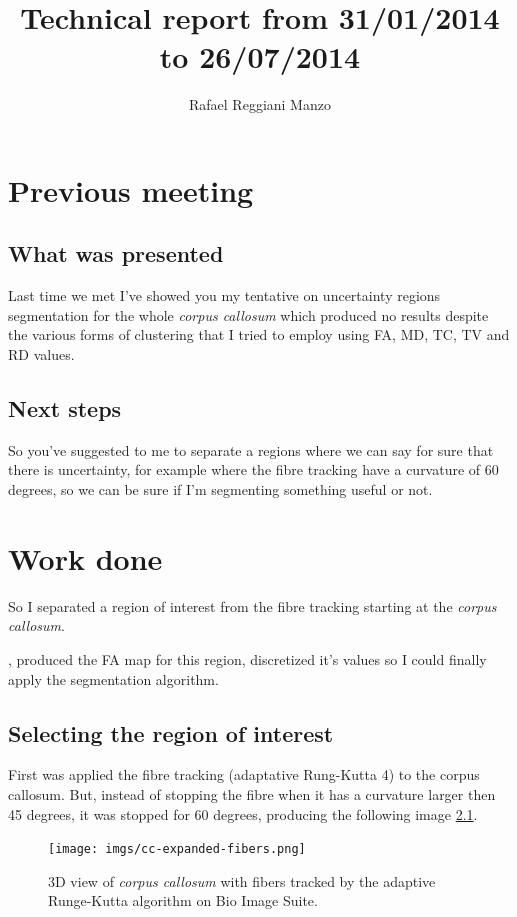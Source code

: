 \documentclass[a4paper,11pt]{report}
\title{Technical report from 31/01/2014 to 26/07/2014}
\author{Rafael Reggiani Manzo}
\begin{document}
\maketitle
\tableofcontents

\chapter{Previous meeting}
  \section{What was presented}
  Last time we met I've showed you my tentative on uncertainty regions segmentation for the whole \textit{corpus callosum} which produced no results despite the various forms of clustering that I tried to employ using FA, MD, TC, TV and RD values.

  \section{Next steps}
  So you've suggested to me to separate a regions where we can say for sure that there is uncertainty, for example where the fibre tracking have a curvature of 60 degrees, so we can be sure if I'm segmenting something useful or not.

\chapter{Work done}
So I separated a region of interest from the fibre tracking starting at the \textit{corpus callosum}.

, produced the FA map for this region, discretized it's values so I could finally apply the segmentation algorithm.

\section{Selecting the region of interest}
  First was applied the fibre tracking (adaptative Rung-Kutta 4) to the corpus callosum. But, instead of stopping the fibre when it has a curvature larger then 45 degrees, it was stopped for 60 degrees, producing the following image \ref{fig:fibres}.

  \begin{figure}[H]
    \texttt{[image: imgs/cc-expanded-fibers.png]}
    \caption{3D view of \textit{corpus callosum} with fibers tracked by the adaptive Runge-Kutta algorithm on Bio Image Suite.}
    \label{fig:fibres}
  \end{figure}
\end{document}

